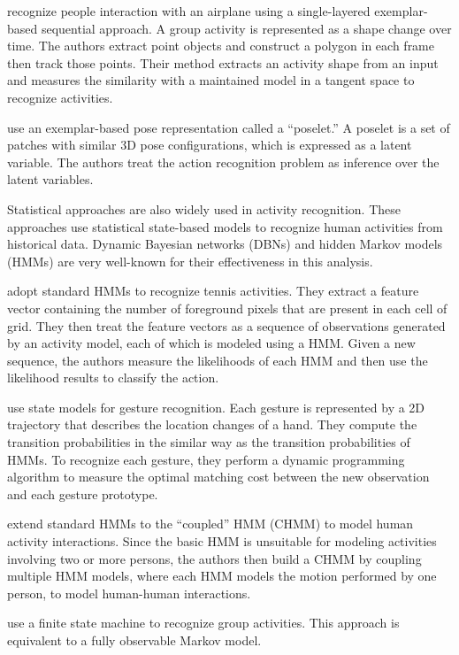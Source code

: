  recognize people interaction with an airplane
using a single-layered exemplar-based sequential approach. A group activity is
represented as a shape change over time. The authors extract point objects and
construct a polygon in each frame then track those points.  Their method
extracts an activity shape from an input and measures the similarity with a
maintained model in a tangent space to recognize activities.

 use an exemplar-based pose
representation called a ``poselet.'' A poselet is a set of patches with similar
3D pose configurations, which is expressed as a latent variable. The authors
treat the action recognition problem as inference over the latent variables. 

Statistical approaches are also widely used in activity recognition. These
approaches use statistical state-based models to recognize human activities
from historical data. Dynamic Bayesian networks (DBNs) and hidden Markov models
(HMMs) are very well-known for their effectiveness in this analysis.

 adopt standard HMMs to recognize tennis activities.
They extract a feature vector containing the number of foreground pixels that
are present in each cell of grid. They then treat the feature vectors as a
sequence of observations generated by an activity model, each of which is
modeled using a HMM. Given a new sequence, the authors  measure the likelihoods
of each HMM and then use the likelihood results to classify the action.

 use state models for gesture recognition. Each
gesture is represented by a 2D trajectory that describes the location changes
of a hand.  They compute the transition probabilities in the similar way as the
transition probabilities of HMMs. To recognize each gesture, they perform a
dynamic programming algorithm to measure the optimal matching cost between the
new observation and each gesture prototype.

 extend standard HMMs to the ``coupled'' HMM
(CHMM) to model human activity interactions. Since the basic HMM is
unsuitable for modeling activities involving two or more persons, the authors
then build a CHMM by coupling multiple HMM models, where each HMM models the
motion performed by one person, to model human-human interactions.

 use a finite state machine to recognize
group activities. This approach is equivalent to a fully observable Markov
model. 

